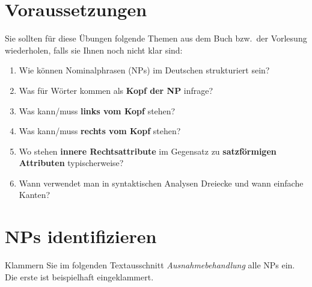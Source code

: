 \section*{Voraussetzungen}

Sie sollten für diese Übungen folgende Themen aus dem Buch bzw.\ der Vorlesung wiederholen, falls sie Ihnen noch nicht klar sind:

\begin{enumerate}\Lf
  \item Wie können Nominalphrasen (NPs) im Deutschen strukturiert sein? 
  \item Was für Wörter kommen als \textbf{Kopf der NP} infrage?
  \item Was kann\slash muss \textbf{links vom Kopf} stehen?
  \item Was kann\slash muss \textbf{rechts vom Kopf} stehen?
  \item Wo stehen \textbf{innere Rechtsattribute} im Gegensatz zu \textbf{satzförmigen Attributen} typischerweise?
  \item Wann verwendet man in syntaktischen Analysen Dreiecke und wann einfache Kanten?
\end{enumerate}

\section{NPs identifizieren}\label{sec:erkennen}

Klammern Sie im folgenden Textausschnitt \textit{Ausnahmebehandlung} alle NPs ein.
Die erste ist beispielhaft eingeklammert.

